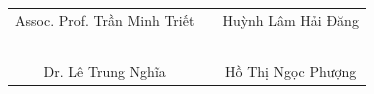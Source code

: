 \documentclass[14pt]{extarticle}
\begin{document}
       \begin{table}[h]
        \begin{tabular}{p{} p{} p{}}
        \multicolumn{1}{c}{Assoc. Prof. Trần Minh Triết} & & \multicolumn{1}{c}{Huỳnh Lâm Hải Đăng} \\
        \multicolumn{1}{c}{} & & \multicolumn{1}{c}{}\\
        \multicolumn{1}{c}{} & & \multicolumn{1}{c}{}\\
        \multicolumn{1}{c}{} & & \multicolumn{1}{c}{}\\
        \multicolumn{1}{c}{} & & \multicolumn{1}{c}{}\\
        \multicolumn{1}{c}{} & & \multicolumn{1}{c}{}\\
        \multicolumn{1}{c}{Dr. Lê Trung Nghĩa} & & \multicolumn{1}{c}{Hồ Thị Ngọc Phượng} \\
        \end{tabular}
    \end{table}
\end{document}
